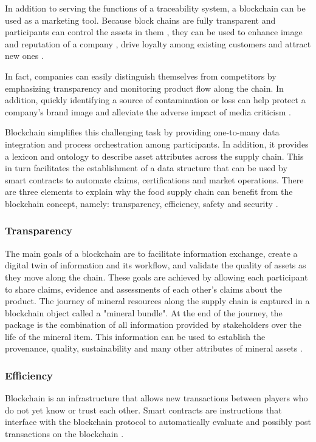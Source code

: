 In addition to serving the functions of a traceability system, a blockchain can be used as a marketing tool. Because block chains are fully transparent\cite{iansiti2017truth} and participants can control the assets in them \cite{liao2011food}, they can be used to enhance image and reputation of a company \cite{van2007essentials}, drive loyalty among existing customers \cite{pizzuti2015global} and attract new ones \cite{svensson2009transparency}. 

In fact, companies can easily distinguish themselves from competitors by emphasizing transparency and monitoring product flow along the chain. In addition, quickly identifying a source of contamination or loss can help protect a company's brand image \cite{mejia2010traceability} and alleviate the adverse impact of media criticism \cite{dabbene2011food}.

Blockchain simplifies this challenging task by providing one-to-many data integration and process orchestration among participants. In addition, it provides a lexicon and ontology to describe asset attributes across the supply chain. This in turn facilitates the establishment of a data structure that can be used by smart contracts to automate claims, certifications and market operations. There are three elements to explain why the food supply chain can benefit from the blockchain concept, namely: transparency, efficiency, safety and security \cite{galvez2018future}.

\subsubsection{Transparency}\label{sec:transparency}

The main goals of a blockchain are to facilitate information exchange, create a digital twin of information and its workflow, and validate the quality of assets as they move along the chain. These goals are achieved by allowing each participant to share claims, evidence and assessments of each other's claims about the product. The journey of mineral resources along the supply chain is captured in a blockchain object called a "mineral bundle". At the end of the journey, the package is the combination of all information provided by stakeholders over the life of the mineral item. This information can be used to establish the provenance, quality, sustainability and many other attributes of mineral assets \cite{martin2017technology}.

\subsubsection{Efficiency}\label{sec:efficiency}
Blockchain is an infrastructure that allows new transactions between players who do not yet know or trust each other. Smart contracts are instructions that interface with the blockchain protocol to automatically evaluate and possibly post transactions on the blockchain \cite{raskin2017law}. 

